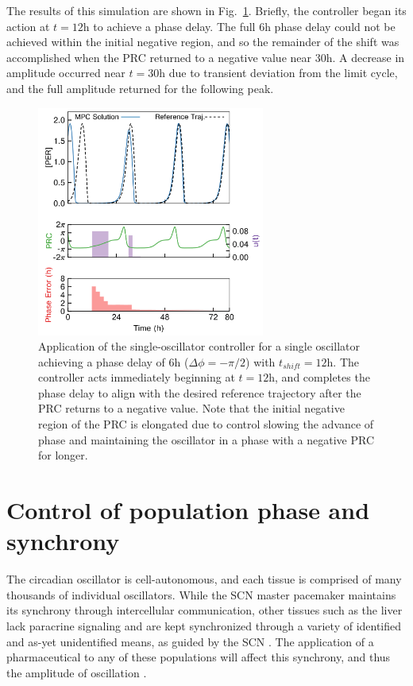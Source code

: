 The results of this simulation are shown in Fig.~\ref{fig:fig2}.
Briefly, the controller began its action at $t=12$h to achieve a phase delay.
The full $6$h phase delay could not be achieved within the initial negative region, and so the remainder of the shift was accomplished when the PRC returned to a negative value near 30h.
A decrease in amplitude occurred near $t=30$h due to transient deviation from the limit cycle, and the full amplitude returned for the following peak.

\begin{figure}[p]
    \begin{center}
\includegraphics[width=7.5cm]{chap7/figures/fig2_single.png}
\end{center}
\caption{Application of the single-oscillator controller for a single oscillator achieving a phase delay of $6$h ($\Delta\phi = -\pi/2$) with $t_{shift} = 12$h. The controller acts immediately beginning at $t=12$h, and completes the phase delay to align with the desired reference trajectory after the PRC returns to a negative value. Note that the initial negative region of the PRC is elongated due to control slowing the advance of phase and maintaining the oscillator in a phase with a negative PRC for longer.}
\label{fig:fig2}       %
\end{figure}


\section{Control of population phase and synchrony}

The circadian oscillator is cell-autonomous, and each tissue is comprised of many thousands of individual oscillators.
While the SCN master pacemaker maintains its synchrony through intercellular communication, other tissues such as the liver lack paracrine signaling and are kept synchronized through a variety of identified and as-yet unidentified means, as guided by the SCN \cite{Welsh2010}.
The application of a pharmaceutical to any of these populations will affect this synchrony, and thus the amplitude of oscillation \cite{Ukai2007,StJohn2014b}.

